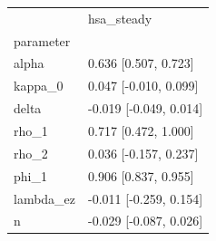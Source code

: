 \begin{tabular}{ll}
\toprule
 & hsa\_steady \\
parameter &  \\
\midrule
alpha & 0.636 [0.507, 0.723] \\
kappa\_0 & 0.047 [-0.010, 0.099] \\
delta & -0.019 [-0.049, 0.014] \\
rho\_1 & 0.717 [0.472, 1.000] \\
rho\_2 & 0.036 [-0.157, 0.237] \\
phi\_1 & 0.906 [0.837, 0.955] \\
lambda\_ez & -0.011 [-0.259, 0.154] \\
n & -0.029 [-0.087, 0.026] \\
\bottomrule
\end{tabular}
